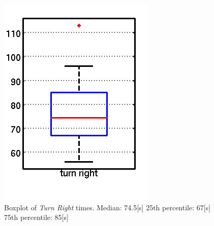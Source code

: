 \begin{figure}
\includegraphics[width=\textwidth]{Files/Figures/box_turn_right.png}
\caption[Box plot of turn right]{Boxplot of \newline \textit{Turn Right} times. \newline
Median: 74.5[s]\newline
25th percentile: 67[s]\newline
75th percentile: 85[s]}
\label{fig:box_turn_right}
\endminipage\hfill
{}

\end{figure}
